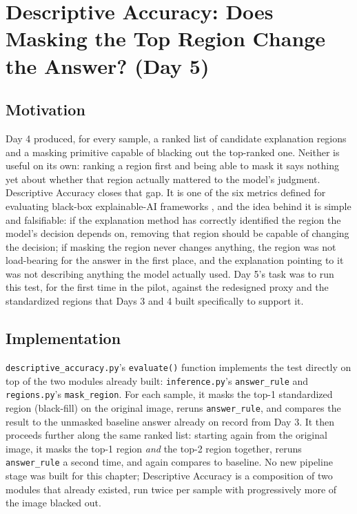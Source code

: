 \chapter{Descriptive Accuracy: Does Masking the Top Region Change the Answer? (Day 5)}
\label{chap:day05}

\section{Motivation}

Day 4 produced, for every sample, a ranked list of candidate explanation regions and a masking
primitive capable of blacking out the top-ranked one. Neither is useful on its own: ranking a region
first and being able to mask it says nothing yet about whether that region actually mattered to the
model's judgment. Descriptive Accuracy closes that gap. It is one of the six metrics defined for
evaluating black-box explainable-AI frameworks \citep{arreche2024exai}, and the idea behind it is
simple and falsifiable: if the explanation method has correctly identified the region the model's
decision depends on, removing that region should be capable of changing the decision; if masking the
region never changes anything, the region was not load-bearing for the answer in the first place, and
the explanation pointing to it was not describing anything the model actually used. Day 5's task was
to run this test, for the first time in the pilot, against the redesigned proxy and the standardized
regions that Days 3 and 4 built specifically to support it.

\section{Implementation}

\texttt{descriptive\_accuracy.py}'s \texttt{evaluate()} function implements the test directly on top
of the two modules already built: \texttt{inference.py}'s \texttt{answer\_rule} and
\texttt{regions.py}'s \texttt{mask\_region}. For each sample, it masks the top-1 standardized region
(black-fill) on the original image, reruns \texttt{answer\_rule}, and compares the result to the
unmasked baseline answer already on record from Day 3. It then proceeds further along the same ranked
list: starting again from the original image, it masks the top-1 region \emph{and} the top-2 region
together, reruns \texttt{answer\_rule} a second time, and again compares to baseline. No new
pipeline stage was built for this chapter; Descriptive Accuracy is a composition of two modules that
already existed, run twice per sample with progressively more of the image blacked out.

